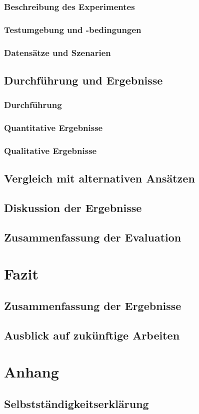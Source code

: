 \documentclass[a4paper,10pt,twoside]{report}
\begin{document}
\subsection{Beschreibung des Experimentes}
\subsection{Testumgebung und -bedingungen}
\subsection{Datensätze und Szenarien}

\section{Durchführung und Ergebnisse}
\subsection{Durchführung}
\subsection{Quantitative Ergebnisse}
\subsection{Qualitative Ergebnisse}

\section{Vergleich mit alternativen Ansätzen}

\section{Diskussion der Ergebnisse}

\section{Zusammenfassung der Evaluation}

\chapter{Fazit}
\section{Zusammenfassung der Ergebnisse}
\section{Ausblick auf zukünftige Arbeiten}

\printbibliography[title={Literaturverzeichnis}]

\appendix
\chapter{Anhang}
\section*{Selbstständigkeitserklärung}
\end{document}
